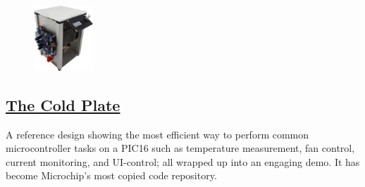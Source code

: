 \documentclass[
	10pt, %
]{FreemanCV}
\begin{document}
\begin{paracol}{2}

\setlength\intextsep{20pt} %
\begin{figure} %
    \includegraphics[width=63pt]{cold_plate} %
\end{figure}

\vspace*{-10pt}
\leavevmode \subsection{\href{https://github.com/microchip-pic-avr-examples/pic16f17146-cold-plate-mplab-mcc}{The Cold Plate \scriptsize\faLink}}

A reference design showing the most efficient way to perform common microcontroller tasks on a PIC16
such as temperature measurement, fan control, current monitoring, and UI-control;
all wrapped up into an engaging demo.
It has become Microchip's most copied code repository.





\end{paracol}
\end{document}
